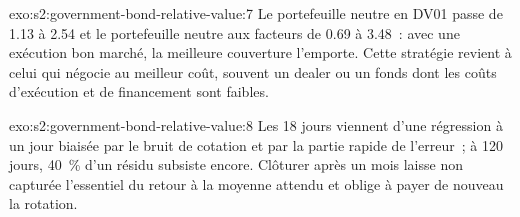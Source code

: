 \begin{solution}{exo:s2:government-bond-relative-value:7}
Le portefeuille neutre en DV01 passe de 1.13 à 2.54 et le portefeuille neutre aux facteurs de 0.69 à 3.48~: avec une exécution bon marché, la meilleure couverture l'emporte. Cette stratégie revient
à celui qui négocie au meilleur coût, souvent un dealer ou un fonds dont les coûts d'exécution et de financement sont faibles.
\end{solution}

\begin{solution}{exo:s2:government-bond-relative-value:8}
Les 18 jours viennent d'une régression à un jour biaisée par le bruit de cotation et par la partie rapide de l'erreur~; à 120 jours, 40~\% d'un résidu subsiste encore.
Clôturer après un mois laisse non capturée l'essentiel du retour à la moyenne attendu et oblige à payer de nouveau la rotation.
\end{solution}

